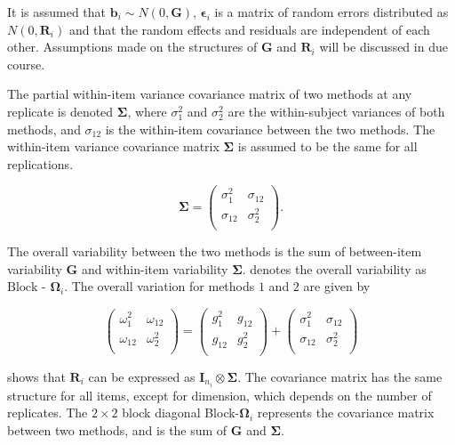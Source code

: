 \documentclass[12pt, a4paper]{report}
\theoremstyle{plain}
\theoremstyle{definition}
\theoremstyle{remark}
\begin{document}
It is assumed that $\boldsymbol{b}_i \sim N(0,\boldsymbol{G})$,
$\boldsymbol{\epsilon}_i$ is a matrix of random errors distributed as $N(0,\boldsymbol{R}_i)$ and
that the random effects and residuals are independent of each other. Assumptions made on the structures of $\boldsymbol{G}$ and $\boldsymbol{R}_i$ will be discussed in due course.


The partial within-item variance covariance matrix of two methods at any replicate is denoted $\boldsymbol{\Sigma}$, where $\sigma^2_{1}$ and $\sigma^2_{2}$ are the within-subject variances of both methods, and $\sigma_{12}$ is the within-item covariance between the two methods. The within-item variance covariance matrix $\boldsymbol{\Sigma}$ is assumed to be the same for all replications.

\[
\boldsymbol{\Sigma} = \left( \begin{array}{cc}
\sigma^2_{1} & \sigma_{12} \\
\sigma_{12} & \sigma^2_{2} \\
\end{array}\right).
\]



The overall variability between the two methods is the sum of between-item variability
$\boldsymbol{G}$ and within-item variability $\boldsymbol{\Sigma}$. \citet{ARoy2009} denotes the overall variability	as ${\mbox{Block - }\boldsymbol \Omega_{i}}$. The overall variation for methods $1$ and $2$ are given by

\begin{center}
	\[\left(\begin{array}{cc}
	\omega^2_1  & \omega_{12} \\
	\omega_{12} & \omega^2_2 \\
	\end{array}  \right)
	=  \left(
	\begin{array}{cc}
	g^2_1  & g_{12} \\
	g_{12} & g^2_2 \\
	\end{array} \right)+
	\left(
	\begin{array}{cc}
	\sigma^2_1  & \sigma_{12} \\
	\sigma_{12} & \sigma^2_2 \\
	\end{array}\right)
	\]
\end{center}
\citet{hamlett} shows that $\boldsymbol{R}_{i}$  can be expressed as $\boldsymbol{I}_{n_{i}} \otimes \boldsymbol{\Sigma}$. The covariance matrix has the same structure for all items, except for dimension, which depends on the number of replicates. The $2 \times 2$ block diagonal Block-$\boldsymbol{\Omega}_{i}$ represents the covariance matrix between two methods, and is the sum of $\boldsymbol{G}$ and $\boldsymbol{\Sigma}$.
\end{document}
